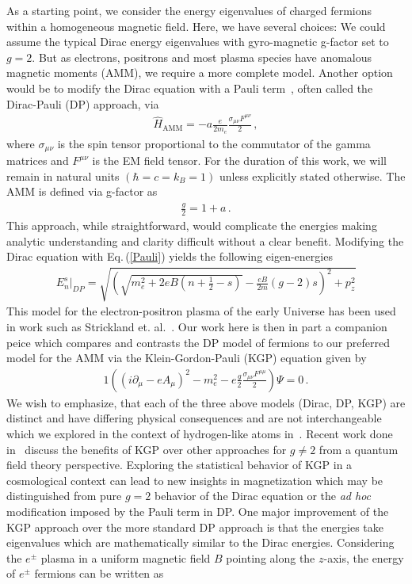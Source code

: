 \documentclass[universe,article,submit,moreauthors,pdftex,a4paper]{Definitions/mdpi}
\newcommand{\req}[1]{Eq.\,(\ref{#1})}
\begin{document}
As a starting point, we consider the energy eigenvalues of charged fermions within a homogeneous magnetic field. Here, we have several choices: We could assume the typical Dirac energy eigenvalues with gyro-magnetic g-factor set to $g=2$. But as electrons, positrons and most plasma species have anomalous magnetic moments (AMM), we require a more complete model. Another option would be to modify the Dirac equation with a Pauli term~\cite{thaller2013dirac}, often called the Dirac-Pauli (DP) approach, via
\begin{align}
 \label{Pauli} \hat{H}_{\mathrm{AMM}} = -a\frac{e}{2m_{e}}\frac{\sigma_{\mu\nu}F^{\mu\nu}}{2}\,,
\end{align}
where $\sigma_{\mu\nu}$ is the spin tensor proportional to the commutator of the gamma matrices and $F^{\mu\nu}$ is the EM field tensor. For the duration of this work, we will remain in natural units $(\hbar=c=k_{B}=1)$ unless explicitly stated otherwise. The AMM is defined via g-factor as
\begin{align}
 \label{AMM} \frac{g}{2}=1+a\,.
\end{align}
This approach, while straightforward, would complicate the energies making analytic understanding and clarity difficult without a clear benefit. Modifying the Dirac equation with \req{Pauli} yields the following eigen-energies
\begin{align}
 \label{DPEnergy} E_{n}^{s}\vert_{DP}=\sqrt{\left(\sqrt{m_{e}^{2}+2eB\left(n+\frac{1}{2}-s\right)}-\frac{eB}{2m}(g-2)s\right)^{2}+p_{z}^{2}}
\end{align}
This model for the electron-positron plasma of the early Universe has been used in work such as Strickland et. al.~\cite{Strickland:2012vu}. Our work here is then in part a companion peice which compares and contrasts the DP model of fermions to our preferred model for the AMM via the Klein-Gordon-Pauli (KGP) equation given by
\begin{alignat}{1}
 \label{KGP} \left(\left(i\partial_{\mu}-eA_{\mu}\right)^{2}-m_{e}^{2}-e\frac{g}{2}\frac{\sigma_{\mu\nu}F^{\mu\mu}}{2}\right)\Psi=0\,.
\end{alignat}
We wish to emphasize, that each of the three above models (Dirac, DP, KGP) are distinct and have differing physical consequences and are not interchangeable which we explored in the context of hydrogen-like atoms in~\cite{Steinmetz:2018ryf}. Recent work done in~\cite{rafelski2023study} discuss the benefits of KGP over other approaches for $g\neq2$ from a quantum field theory perspective. Exploring the statistical behavior of KGP in a cosmological context can lead to new insights in magnetization which may be distinguished from pure $g=2$ behavior of the Dirac equation or the \emph{ad hoc} modification imposed by the Pauli term in DP. One major improvement of the KGP approach over the more standard DP approach is that the energies take eigenvalues which are mathematically similar to the Dirac energies. Considering the $e^\pm$ plasma in a uniform magnetic field $B$ pointing along the $z$-axis, the energy of $e^\pm$ fermions can be written as
\end{document}
